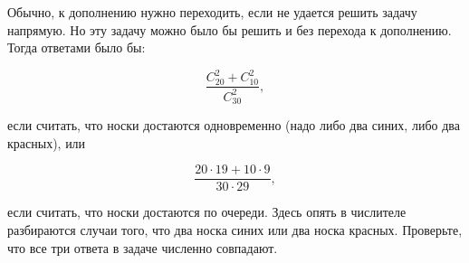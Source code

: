 \documentclass{article}
\newcommand{\cc}[2]{C_{#1}^{#2}}
\begin{document}
Обычно, к дополнению нужно переходить, если не удается решить задачу напрямую. Но эту задачу можно было бы решить и без перехода к дополнению. Тогда ответами было бы:

$$\dfrac{\cc{20}{2} + \cc{10}{2}}{\cc{30}{2}},$$

если считать, что носки достаются одновременно (надо либо два синих, либо два красных), или

$$\dfrac{20\cdot19 + 10\cdot9}{30\cdot29},$$

если считать, что носки достаются по очереди. Здесь опять в числителе разбираются случаи того, что два носка синих или два носка красных.
Проверьте, что все три ответа в задаче численно совпадают.
\end{document}
